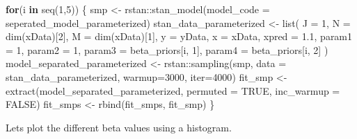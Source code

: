 \documentclass[
]{article}
\newenvironment{Shaded}{\begin{snugshade}}{\end{snugshade}}
\newcommand{\AttributeTok}[1]{\textcolor[rgb]{0.77,0.63,0.00}{#1}}
\newcommand{\ConstantTok}[1]{\textcolor[rgb]{0.00,0.00,0.00}{#1}}
\newcommand{\ControlFlowTok}[1]{\textcolor[rgb]{0.13,0.29,0.53}{\textbf{#1}}}
\newcommand{\DecValTok}[1]{\textcolor[rgb]{0.00,0.00,0.81}{#1}}
\newcommand{\FloatTok}[1]{\textcolor[rgb]{0.00,0.00,0.81}{#1}}
\newcommand{\FunctionTok}[1]{\textcolor[rgb]{0.00,0.00,0.00}{#1}}
\newcommand{\NormalTok}[1]{#1}
\newcommand{\OtherTok}[1]{\textcolor[rgb]{0.56,0.35,0.01}{#1}}
\newcommand{\SpecialCharTok}[1]{\textcolor[rgb]{0.00,0.00,0.00}{#1}}
\begin{document}
\begin{Shaded}
\begin{Highlighting}[]
\ControlFlowTok{for}\NormalTok{(i }\ControlFlowTok{in} \FunctionTok{seq}\NormalTok{(}\DecValTok{1}\NormalTok{,}\DecValTok{5}\NormalTok{)) \{}
\NormalTok{  smp }\OtherTok{\textless{}{-}}\NormalTok{ rstan}\SpecialCharTok{::}\FunctionTok{stan\_model}\NormalTok{(}\AttributeTok{model\_code =}\NormalTok{ seperated\_model\_parameterized)}
\NormalTok{  stan\_data\_parameterized }\OtherTok{\textless{}{-}} \FunctionTok{list}\NormalTok{(}
      \AttributeTok{J =} \DecValTok{1}\NormalTok{,}
      \AttributeTok{N =} \FunctionTok{dim}\NormalTok{(xData)[}\DecValTok{2}\NormalTok{],}
      \AttributeTok{M =} \FunctionTok{dim}\NormalTok{(xData)[}\DecValTok{1}\NormalTok{],}
      \AttributeTok{y =}\NormalTok{ yData,}
      \AttributeTok{x =}\NormalTok{ xData,}
      \AttributeTok{xpred =} \FloatTok{1.1}\NormalTok{,}
      \AttributeTok{param1 =} \DecValTok{1}\NormalTok{,}
      \AttributeTok{param2 =} \DecValTok{1}\NormalTok{,}
      \AttributeTok{param3 =}\NormalTok{ beta\_priors[i, }\DecValTok{1}\NormalTok{],}
      \AttributeTok{param4 =}\NormalTok{ beta\_priors[i, }\DecValTok{2}\NormalTok{]}
\NormalTok{  )}
\NormalTok{  model\_separated\_parameterized }\OtherTok{\textless{}{-}}\NormalTok{ rstan}\SpecialCharTok{::}\FunctionTok{sampling}\NormalTok{(smp, }\AttributeTok{data =}\NormalTok{ stan\_data\_parameterized, }\AttributeTok{warmup=}\DecValTok{3000}\NormalTok{, }\AttributeTok{iter=}\DecValTok{4000}\NormalTok{)}
\NormalTok{  fit\_smp }\OtherTok{\textless{}{-}} \FunctionTok{extract}\NormalTok{(model\_separated\_parameterized, }\AttributeTok{permuted =} \ConstantTok{TRUE}\NormalTok{, }\AttributeTok{inc\_warmup =} \ConstantTok{FALSE}\NormalTok{)}
\NormalTok{  fit\_smps }\OtherTok{\textless{}{-}} \FunctionTok{rbind}\NormalTok{(fit\_smps, fit\_smp)}
\NormalTok{\}}
\end{Highlighting}
\end{Shaded}

Lets plot the different beta values using a histogram.
\end{document}
